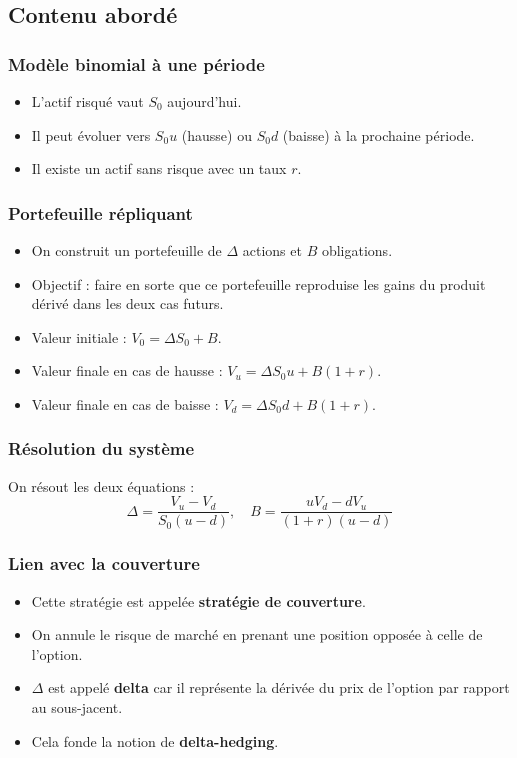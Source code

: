 \documentclass[a4paper,11pt]{article}
\begin{document}
\subsection{Contenu abordé}

\subsubsection*{Modèle binomial à une période}
\begin{itemize}
    \item L’actif risqué vaut \(S_0\) aujourd’hui.
    \item Il peut évoluer vers \(S_0 u\) (hausse) ou \(S_0 d\) (baisse) à la prochaine période.
    \item Il existe un actif sans risque avec un taux \(r\).
\end{itemize}

\subsubsection*{Portefeuille répliquant}
\begin{itemize}
    \item On construit un portefeuille de \(\Delta\) actions et \(B\) obligations.
    \item Objectif : faire en sorte que ce portefeuille reproduise les gains du produit dérivé dans les deux cas futurs.
    \item Valeur initiale : \(V_0 = \Delta S_0 + B\).
    \item Valeur finale en cas de hausse : \(V_u = \Delta S_0 u + B(1 + r)\).
    \item Valeur finale en cas de baisse : \(V_d = \Delta S_0 d + B(1 + r)\).
\end{itemize}

\subsubsection*{Résolution du système}
On résout les deux équations :
\[
\Delta = \frac{V_u - V_d}{S_0 (u - d)}, \quad B = \frac{u V_d - d V_u}{(1 + r)(u - d)}
\]

\subsubsection*{Lien avec la couverture}
\begin{itemize}
    \item Cette stratégie est appelée \textbf{stratégie de couverture}.
    \item On annule le risque de marché en prenant une position opposée à celle de l’option.
    \item \(\Delta\) est appelé \textbf{delta} car il représente la dérivée du prix de l’option par rapport au sous-jacent.
    \item Cela fonde la notion de \textbf{delta-hedging}.
\end{itemize}
\end{document}
